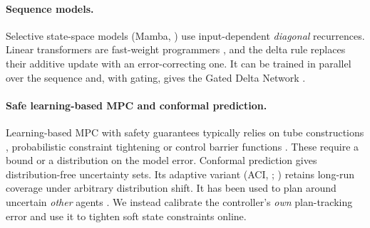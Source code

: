 \paragraph{Sequence models.}
Selective state-space models (Mamba, \citealp{gu2023mamba}) use input-dependent \emph{diagonal} recurrences. Linear transformers are fast-weight programmers \citep{schlag2021linear}, and the delta rule \citep{widrow1960adaptive} replaces their additive update with an error-correcting one. It can be trained in parallel over the sequence \citep{yang2024parallelizing} and, with gating, gives the Gated Delta Network \citep{yang2025gated}.

\paragraph{Safe learning-based MPC and conformal prediction.}
Learning-based MPC with safety guarantees typically relies on tube constructions \citep{mayne2005robust}, probabilistic constraint tightening \citep{hewing2020cautious,hewing2020learning} or control barrier functions \citep{ames2019cbf}. These require a bound or a distribution on the model error.
Conformal prediction gives distribution-free uncertainty sets. Its adaptive variant (ACI, \citealp{gibbs2021adaptive}; \citealp{angelopoulos2023conformal}) retains long-run coverage under arbitrary distribution shift. It has been used to plan around uncertain \emph{other} agents \citep{lindemann2023safe,dixit2023adaptive}. We instead calibrate the controller's \emph{own} plan-tracking error and use it to tighten soft state constraints \citep{kerrigan2000soft} online.
